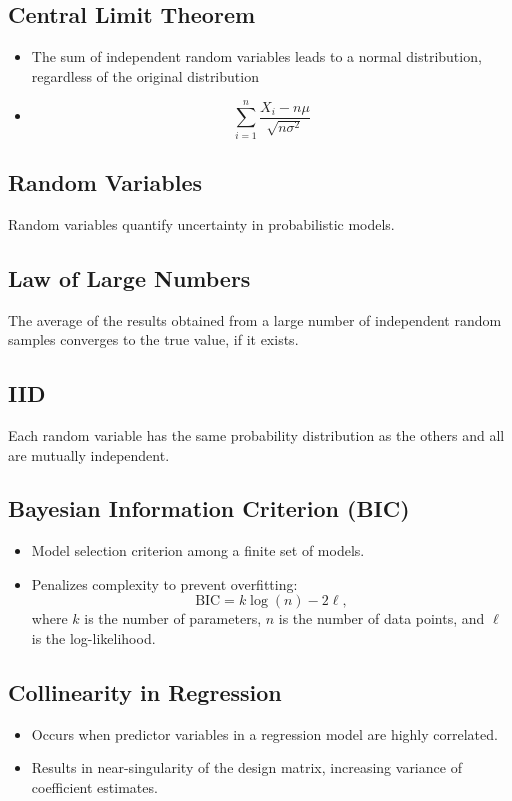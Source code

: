 \documentclass[12pt,a4paper]{article}
\begin{document}
\subsection{Central Limit Theorem}
\begin{itemize}
    \item The sum of independent random variables leads to a normal distribution, regardless of the original distribution
    \item \[\sum_{i=1}^n \frac{X_i-n\mu}{\sqrt{n\sigma^2}}\]
\end{itemize}
\subsection{Random Variables}
Random variables quantify uncertainty in probabilistic models.
\subsection{Law of Large Numbers}
The average of the results obtained from a large number of independent random samples converges to the true value, if it exists.

\subsection{IID}
Each random variable has the same probability distribution as the others and all are mutually independent.


\subsection{Bayesian Information Criterion (BIC)}
\begin{itemize}
    \item Model selection criterion among a finite set of models.
    \item Penalizes complexity to prevent overfitting:
    \[ \text{BIC} = k \log(n) - 2 \ell, \]
    where $k$ is the number of parameters, $n$ is the number of data points, and $\ell$ is the log-likelihood.
\end{itemize}

\subsection{Collinearity in Regression}
\begin{itemize}
    \item Occurs when predictor variables in a regression model are highly correlated.
    \item Results in near-singularity of the design matrix, increasing variance of coefficient estimates.
\end{itemize}
\end{document}
